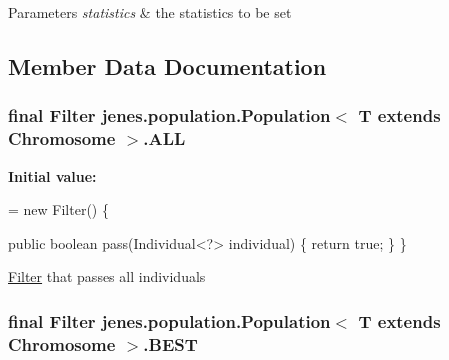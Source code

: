\begin{DoxyParams}{Parameters}
{\em statistics} & the statistics to be set \\
\hline
\end{DoxyParams}


\subsection{Member Data Documentation}
\hypertarget{classjenes_1_1population_1_1_population_3_01_t_01extends_01_chromosome_01_4_a5cfea1b7e0a14171b85d3ae7460f0723}{
\subsubsection[{A\-L\-L}]{\setlength{\rightskip}{0pt plus 5cm}final Filter jenes.\-population.\-Population$<$ T extends Chromosome $>$.A\-L\-L\hspace{0.3cm}{\ttfamily [static]}}}\label{classjenes_1_1population_1_1_population_3_01_t_01extends_01_chromosome_01_4_a5cfea1b7e0a14171b85d3ae7460f0723}
{\bfseries Initial value\-:}
\begin{DoxyCode}
= \textcolor{keyword}{new} Filter() \{

        \textcolor{keyword}{public} \textcolor{keywordtype}{boolean} pass(Individual<?> individual) \{
            \textcolor{keywordflow}{return} \textcolor{keyword}{true};
        \}
    \}
\end{DoxyCode}
\hyperlink{interfacejenes_1_1population_1_1_population_3_01_t_01extends_01_chromosome_01_4_1_1_filter}{Filter} that passes all individuals \hypertarget{classjenes_1_1population_1_1_population_3_01_t_01extends_01_chromosome_01_4_abf7824fc3827456cc071a313586adf20}{
\subsubsection[{B\-E\-S\-T}]{\setlength{\rightskip}{0pt plus 5cm}final Filter jenes.\-population.\-Population$<$ T extends Chromosome $>$.B\-E\-S\-T\hspace{0.3cm}{\ttfamily [static]}}}\label{classjenes_1_1population_1_1_population_3_01_t_01extends_01_chromosome_01_4_abf7824fc3827456cc071a313586adf20}
